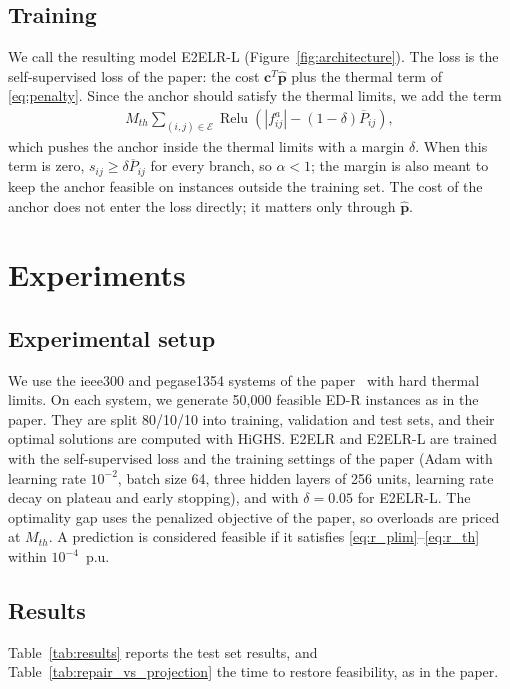 \documentclass[12pt]{article}
\begin{document}
\subsection{Training}

We call the resulting model E2ELR-L (Figure~\ref{fig:architecture}).
The loss is the self-supervised loss of the paper: the cost $\boldsymbol{c}^T \hat{\boldsymbol{p}}$ plus the thermal term of \eqref{eq:penalty}.
Since the anchor should satisfy the thermal limits, we add the term
\begin{align}
    M_{th} \sum_{(i,j) \in \mathcal{E}} \operatorname{Relu}(|f^a_{ij}| - (1 - \delta) \overline{P}_{ij}), \label{eq:anchor}
\end{align}
which pushes the anchor inside the thermal limits with a margin $\delta$. When this term is zero, $s_{ij} \geq \delta \overline{P}_{ij}$ for every branch, so $\alpha < 1$; the margin is also meant to keep the anchor feasible on instances outside the training set. The cost of the anchor does not enter the loss directly; it matters only through $\hat{\boldsymbol{p}}$.


\section{Experiments}
\subsection{Experimental setup}
We use the ieee300 and pegase1354 systems of the paper~\cite{Chen2023_E2ELR} with hard thermal limits.
On each system, we generate 50{,}000 feasible ED-R instances as in the paper.
They are split 80/10/10 into training, validation and test sets, and their optimal solutions are computed with HiGHS.
E2ELR and E2ELR-L are trained with the self-supervised loss and the training settings of the paper (Adam with learning rate $10^{-2}$, batch size 64, three hidden layers of 256 units, learning rate decay on plateau and early stopping), and with $\delta = 0.05$ for E2ELR-L.
The optimality gap uses the penalized objective of the paper, so overloads are priced at $M_{th}$.
A prediction is considered feasible if it satisfies \eqref{eq:r_plim}--\eqref{eq:r_th} within $10^{-4}$~p.u.

\subsection{Results}
Table~\ref{tab:results} reports the test set results, and Table~\ref{tab:repair_vs_projection} the time to restore feasibility, as in the paper.
\end{document}
